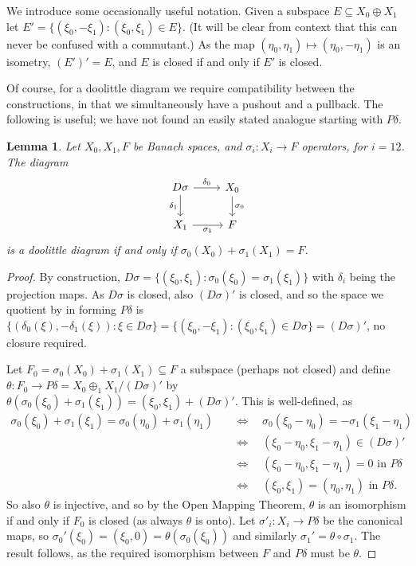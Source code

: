 \documentclass[a4paper,11pt]{article}
\theoremstyle{plain}
\newtheorem{lemma}[proposition]{Lemma}
\theoremstyle{remark}
\newenvironment{remark}
  {\pushQED{\qed}\renewcommand{\qedsymbol}{$\triangle$}\remarkx}
  {\popQED\endremarkx}
\begin{document}
\begin{remark}
We introduce some occasionally useful notation.  Given a subspace $E\subseteq X_0\oplus X_1$ let $E' = \{ (\xi_0, -\xi_1) : (\xi_0,\xi_1) \in E \}$.  (It will be clear from context that this can never be confused with a commutant.)  As the map $(\eta_0,\eta_1) \mapsto (\eta_0, -\eta_1)$ is an isometry, $(E')' = E$, and $E$ is closed if and only if $E'$ is closed.
\end{remark}

Of course, for a doolittle diagram we require compatibility between the constructions, in that we simultaneously have a pushout and a pullback.  The following is useful; we have not found an easily stated analogue starting with $P\delta$.
  
\begin{lemma}\label{lem:when_doolittle_from_pullback}
Let $X_0, X_1, F$ be Banach spaces, and $\sigma_i\colon X_i\to F$ operators, for $i=12$.  The diagram
\[ \begin{tikzcd}
D\sigma \arrow[r, "\delta_0"] \arrow[d, "\delta_1"'] & X_0 \arrow[d, "\sigma_0"] \\
X_1 \arrow[r, "\sigma_1"'] & F
\end{tikzcd} \]
is a doolittle diagram if and only if $\sigma_0(X_0) + \sigma_1(X_1) = F$.
\end{lemma}
\begin{proof}
By construction, $D\sigma = \{ (\xi_0,\xi_1) : \sigma_0(\xi_0) = \sigma_1(\xi_1) \}$ with $\delta_i$ being the projection maps.  As $D\sigma$ is closed, also $(D\sigma)'$ is closed, and so the space we quotient by in forming $P\delta$ is $\{ (\delta_0(\xi), -\delta_1(\xi)) : \xi\in D\sigma \} = \{ (\xi_0, -\xi_1) : (\xi_0,\xi_1) \in D\sigma \} = (D\sigma)'$, no closure required.

Let $F_0 = \sigma_0(X_0) + \sigma_1(X_1) \subseteq F$ a subspace (perhaps not closed) and define $\theta \colon F_0 \to P\delta =  X_0 \oplus_1 X_1 / (D\sigma)'$ by $\theta(\sigma_0(\xi_0) + \sigma_1(\xi_1)) = (\xi_0, \xi_1) + (D\sigma)'$.  This is well-defined, as
\begin{align*}
\sigma_0(\xi_0) + \sigma_1(\xi_1) = \sigma_0(\eta_0) + \sigma_1(\eta_1)
\quad&\Leftrightarrow\quad  \sigma_0(\xi_0-\eta_0) = -\sigma_1(\xi_1-\eta_1)  \\
&\Leftrightarrow\quad  (\xi_0-\eta_0, \xi_1-\eta_1) \in (D\sigma)'   \\
&\Leftrightarrow\quad  (\xi_0-\eta_0, \xi_1-\eta_1) = 0 \text{ in } P\delta   \\
&\Leftrightarrow\quad  (\xi_0, \xi_1) = (\eta_0, \eta_1) \text{ in } P\delta.
\end{align*}
So also $\theta$ is injective, and so by the Open Mapping Theorem, $\theta$ is an isomorphism if and only if $F_0$ is closed (as always $\theta$ is onto).  Let $\sigma'_i \colon X_i \to P\delta$ be the canonical maps, so $\sigma_0'(\xi_0) = (\xi_0,0) = \theta(\sigma_0(\xi_0))$ and similarly $\sigma_1' = \theta\circ\sigma_1$.  The result follows, as the required isomorphism between $F$ and $P\delta$ must be $\theta$.
\end{proof}
\end{document}
